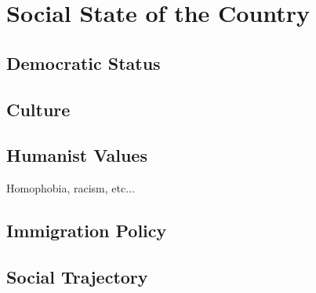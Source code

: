 \section{Social State of the Country}

\subsection{Democratic Status}

\subsection{Culture}

\subsection{Humanist Values}
Homophobia, racism, etc...

\subsection{Immigration Policy}

\subsection{Social Trajectory}

